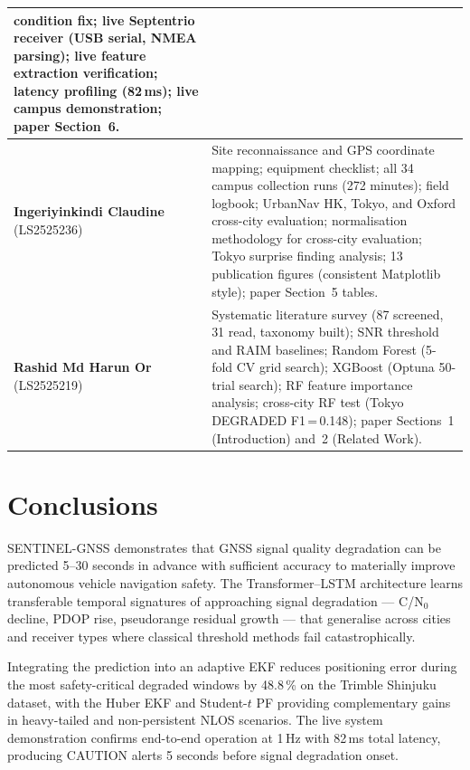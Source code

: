 \documentclass[12pt,a4paper]{article}
\begin{document}
\begin{table}[H]
\begin{tabularx}{\textwidth}{>{\raggedright\arraybackslash}p{3cm}X}
      condition fix; live Septentrio receiver (USB serial, NMEA parsing); live
      feature extraction verification; latency profiling (82\,ms); live campus
      demonstration; paper Section~6. \\
    \midrule
    \textbf{Ingeriyinkindi Claudine} (LS2525236) &
      Site reconnaissance and GPS coordinate mapping; equipment checklist;
      all 34 campus collection runs (272 minutes); field logbook; UrbanNav HK,
      Tokyo, and Oxford cross-city evaluation; normalisation methodology for
      cross-city evaluation; Tokyo surprise finding analysis; 13 publication
      figures (consistent Matplotlib style); paper Section~5 tables. \\
    \midrule
    \textbf{Rashid Md Harun Or} (LS2525219) &
      Systematic literature survey (87 screened, 31 read, taxonomy built);
      SNR threshold and RAIM baselines; Random Forest (5-fold CV grid search);
      XGBoost (Optuna 50-trial search); RF feature importance analysis;
      cross-city RF test (Tokyo DEGRADED F1\,=\,0.148); paper Sections~1
      (Introduction) and~2 (Related Work). \\
    \bottomrule
  \end{tabularx}
\end{table}

\section{Conclusions}
\label{sec:conclusion}

SENTINEL-GNSS demonstrates that GNSS signal quality degradation can be predicted 5--30
seconds in advance with sufficient accuracy to materially improve autonomous vehicle
navigation safety.
The Transformer--LSTM architecture learns transferable temporal signatures of
approaching signal degradation --- C/N$_0$ decline, PDOP rise, pseudorange residual
growth --- that generalise across cities and receiver types where classical threshold
methods fail catastrophically.

Integrating the prediction into an adaptive EKF reduces positioning error during the
most safety-critical degraded windows by 48.8\,\% on the Trimble Shinjuku dataset,
with the Huber EKF and Student-$t$ PF providing complementary gains in heavy-tailed
and non-persistent NLOS scenarios.
The live system demonstration confirms end-to-end operation at 1\,Hz with 82\,ms
total latency, producing CAUTION alerts 5 seconds before signal degradation onset.
\end{document}
